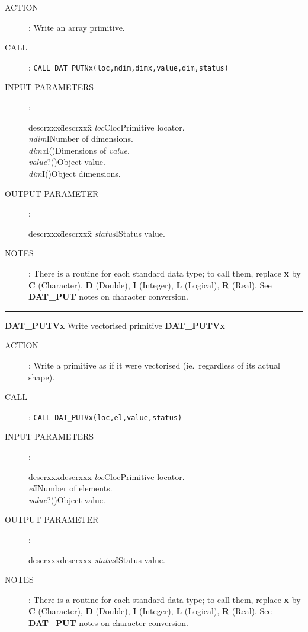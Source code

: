\begin{description}
\item [ACTION]:
Write an array primitive.
\item [CALL]:
{\tt CALL DAT\_PUTNx(loc,ndim,dimx,value,dim,status)}
\item [INPUT PARAMETERS]:
\begin{tabbing}
descrxxx\=descrxxx\=\kill
{\em loc}\>Cloc\>Primitive locator.\\
{\em ndim}\>I\>Number of dimensions.\\
{\em dimx}\>I()\>Dimensions of {\em value}.\\
{\em value}\>?()\>Object value.\\
{\em dim}\>I()\>Object dimensions.
\end{tabbing}
\item [OUTPUT PARAMETER]:
\begin{tabbing}
descrxxx\=descrxxx\=\kill
{\em status}\>I\>Status value.
\end{tabbing}
\item [NOTES]:
There is a routine for each standard data type; to call them, replace {\bf x}
by {\bf C} (Character), {\bf D} (Double), {\bf I} (Integer), {\bf L} (Logical),
{\bf R} (Real).
See {\bf DAT\_PUT} notes on character conversion.
\end{description}
\goodbreak
\rule{\textwidth}{0.3mm}
{\Large {\bf DAT\_PUTVx} \hfill Write vectorised primitive \hfill {\bf DAT\_PUTVx}}
\begin{description}
\item [ACTION]:
Write a primitive as if it were vectorised (ie.\ regardless of its actual
shape).
\item [CALL]:
{\tt CALL DAT\_PUTVx(loc,el,value,status)}
\item [INPUT PARAMETERS]:
\begin{tabbing}
descrxxx\=descrxxx\=\kill
{\em loc}\>Cloc\>Primitive locator.\\
{\em el}\>I\>Number of elements.\\
{\em value}\>?()\>Object value.
\end{tabbing}
\item [OUTPUT PARAMETER]:
\begin{tabbing}
descrxxx\=descrxxx\=\kill
{\em status}\>I\>Status value.
\end{tabbing}
\item [NOTES]:
There is a routine for each standard data type; to call them, replace {\bf x}
by {\bf C} (Character), {\bf D} (Double), {\bf I} (Integer), {\bf L} (Logical),
{\bf R} (Real).
See {\bf DAT\_PUT} notes on character conversion.
\end{description}
\goodbreak

